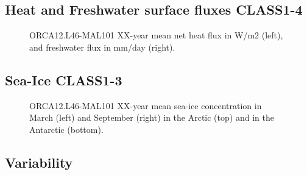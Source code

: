 \subsection{Heat and Freshwater surface fluxes CLASS1-4}

\begin{figure}[H]
\begin{center}
\begin{minipage}{0.47\linewidth}
\end{minipage}
\hfill
\begin{minipage}{0.47\linewidth}
\end{minipage}
\caption{ORCA12.L46-MAL101 XX-year mean net heat flux in W/m2 (left), and freshwater flux in mm/day (right).}
\end{center}
\end{figure}

\subsection{Sea-Ice CLASS1-3}

\begin{figure}[H]
\begin{center}
\begin{minipage}{0.47\linewidth}
\end{minipage}
\hfill
\begin{minipage}{0.47\linewidth}
\end{minipage}
\begin{minipage}{0.47\linewidth}
\end{minipage}
\hfill
\begin{minipage}{0.47\linewidth}
\end{minipage}
\caption{ORCA12.L46-MAL101 XX-year mean sea-ice concentration in March (left) and September (right) in the Arctic (top) and in the Antarctic (bottom).}
\end{center}
\end{figure}

\subsection{Variability}

